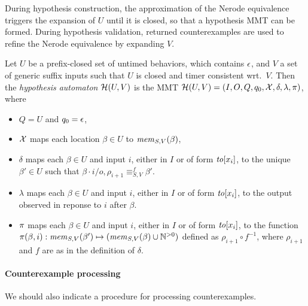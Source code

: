 During hypothesis construction, 
the approximation of the Nerode equivalence triggers the expansion of
$U$ until it is closed, so that a hypothesis MMT can be formed.
During hypothesis validation, returned counterexamples are used to refine
the Nerode equivalence by expanding $V$.


\begin{definition}
  Let $U$ be a prefix-closed set
  of untimed behaviors, which contains $\emptyword$,
  and $V$ a set of generic suffix inputs such that
$U$ is closed and timer consistent wrt.\ $V$. Then the
{\em hypothesis automaton} $\hypoof UV$ is the MMT
$\hypoof UV = (I, O, Q, q_0, \vars, \delta, \lambda, \remap)$, where
\begin{itemize}
\item $Q = U$ and $q_0 = \emptyword$,
\item $\vars$ maps each location $\beta\in U$ to $\getmemorable{S}{\beta}{V}$,
\item $\delta$ maps each $\beta \in U$ and input
  $i$, either in $I$ or of form $\toevent{x_i}$,
  to the unique $\beta' \in U$ such that
$\beta \cdot i/o,\rho_{i+1} \equiv_{S,V}^f \beta'$.
\item $\lambda$ maps each $\beta \in U$ and input
  $i$, either in $I$ or of form $\toevent{x_i}$, to the output observed in
  reponse to $i$ after $\beta$.
\item $\remap$
 maps each $\beta \in U$ and input
$i$, either in $I$ or of form $\toevent{x_i}$, to the function
  $\remap(\beta,i):\getmemorable{S}{\beta'}{V} \mapsto (\getmemorable{S}{\beta}{V} \cup \natplus)$ defined as $\rho_{i+1} \circ f^{-1}$, where $\rho_{i+1}$ and $f$
  are as in the definition of $\delta$.
\end{itemize}
\end{definition}

\paragraph{Counterexample processing}
We should also indicate a procedure for processing counterexamples.
